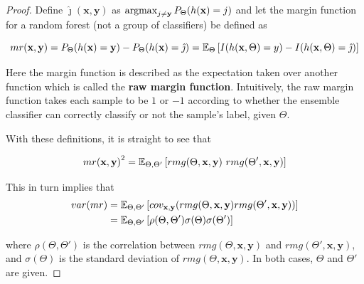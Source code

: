 \begin{proof}
	Define $\hat{\jmath}( \textbf{x},\textbf{y})$ as $\operatorname*{argmax}_{j \neq \textbf{y}} P_{\Theta}(h(\textbf{x}) = j)$ and let the margin function for a random forest (not a group of classifiers) be defined as

	\[\label{eq:rf-marginFunRf}
	mr(\textbf{x},\textbf{y}) = P_{\Theta}(h(\textbf{x}) = \textbf{y}) - P_{\Theta}(h(\textbf{x}) = \hat{\jmath})
	\\
	= \operatorname{\mathbb{E}}_{\Theta} \left[ I(h(\textbf{x},\Theta ) = y ) - I( h( \textbf{x},\Theta ) = \hat{\jmath} ) \right]
	\]




	Here the margin function is described as the expectation taken over another function which is called the \textbf{raw margin function}\label{eq:rf-rawMarginFun}.
    Intuitively, the raw margin function takes each sample to be $1$ or $-1$ according to whether the ensemble classifier can correctly classify or not the sample's label, given $\Theta$.

	With these definitions, it is straight to see that

            \begin{equation}
            {mr( \textbf{x},\textbf{y} )}^2 = \Expect_{\Theta, \Theta'} \left[ rmg( \Theta,\textbf{x},\textbf{y} ) \ rmg(\Theta',\textbf{x},\textbf{y} ) \right]
            \end{equation}


	This in turn implies that
            \begin{equation}\label{eq:rf-marginFunVar}
	            \begin{split}
	            var(mr) & = \operatorname{\mathbb{E}}_{\Theta, \Theta'}
	            \left[
	            cov_{\textbf{x},\textbf{y}}
	            (rmg(\Theta,\textbf{x},\textbf{y} )rmg(\Theta',\textbf{x},\textbf{y} ))
	            \right] \\
	            & = \operatorname{\mathbb{E}}_{\Theta, \Theta'}
	            \left[
	            \rho(\Theta, \Theta')\sigma(\Theta)\sigma(\Theta')
	            \right]
	            \end{split}
            \end{equation}

	where $ \rho(\Theta, \Theta')$ is the correlation between $rmg(\Theta,\textbf{x},\textbf{y})$ and $rmg(\Theta',\textbf{x},\textbf{y})$, and $\sigma(\Theta)$ is the standard deviation of $rmg(\Theta,\textbf{x},\textbf{y})$.
    In both cases, $\Theta$ and $\Theta'$ are given.%


\end{proof}
